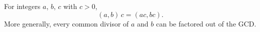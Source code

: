 For integers $a$, $b$, $c$ with $c > 0$,
$$(a, b) \, c = (ac, bc).$$
More generally, every common divisor of $a$ and $b$ can be factored out of the GCD.
